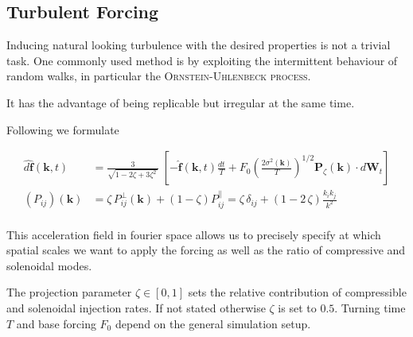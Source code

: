 \subsection{Turbulent Forcing}

Inducing natural looking turbulence with the desired properties is not a
trivial task. One commonly used method is by exploiting the intermittent
behaviour of random walks, in particular the \textsc{Ornstein-Uhlenbeck process}.

It has the advantage of being replicable but irregular at the same time.

Following \cite{schmidt2009} we formulate

\begin{align}
  \hat{d\mathbf{f}}(\mathbf{k},t) &= \frac{3}{\sqrt{1-2\zeta+3\zeta^2\,}}\;\left[-\hat{\mathbf{f}}(\mathbf{k},t)\frac{dt}{T} + F_0 \left(\frac{2\sigma^2(\mathbf{k})}{T}\right)^{1/2}\mathbf{P}_\zeta(\mathbf{k})\cdot d\mathbf{W}_t\right]\\
  (P_{ij})(\mathbf{k}) &= \zeta\,P_{ij}^\perp(\mathbf{k}) + (1-\zeta) P_{ij}^\parallel =\zeta\,\delta_{ij} + (1-2\,\zeta) \frac{k_i k_j}{k^2}\\
\end{align}

This acceleration field in fourier space allows us to precisely specify at
which spatial scales we want to apply the forcing as well as the ratio of
compressive and solenoidal modes.

The projection parameter $\zeta \in [0,1]$ sets the relative contribution of
compressible and solenoidal injection rates. If not stated otherwise $\zeta$ is
set to $0.5$. Turning time $T$ and base forcing $F_0$ depend on the general
simulation setup.

